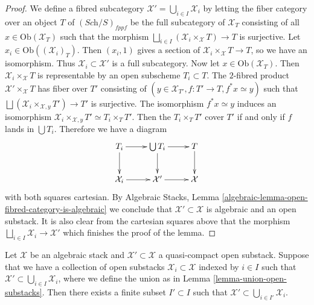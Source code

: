 \begin{proof}
We define a fibred subcategory
$\mathcal{X}' = \bigcup_{i \in I} \mathcal{X}_i$ 
by letting the fiber category over an object $T$ of $(\textit{Sch}/S)_{fppf}$
be the full subcategory of $\mathcal{X}_T$ consisting of all
$x \in \text{Ob}(\mathcal{X}_T)$ such that the morphism
$\bigsqcup_{i \in I} (\mathcal{X}_i \times_{\mathcal X} T) \to T$
is surjective. Let $x_i \in \text{Ob}((\mathcal{X}_i)_T)$.
Then $(x_i, 1)$ gives a section of 
$\mathcal{X}_i \times_{\mathcal X} T \to T$, so we have an isomorphism. Thus
$\mathcal{X}_i \subset \mathcal{X}'$ is a full subcategory. 
Now let $x \in \text{Ob}(\mathcal{X}_T)$. Then
$\mathcal{X}_i \times_{\mathcal X} T$ is representable
by an open subscheme $T_i \subset T$. The $2$-fibred product 
$\mathcal{X}' \times_{\mathcal X} T$ has fiber over $T'$ consisting
of $(y \in \mathcal{X}_{T'}, f : T' \to T, f^*x \simeq y)$ such that 
$\bigsqcup (\mathcal{X}_i \times_{\mathcal X, y} T') \to T'$ is surjective. 
The isomorphism $f^*x \simeq y$ induces an isomorphism
$\mathcal{X}_i \times_{\mathcal X,y} T' \simeq T_i \times_T T'$.
Then the $T_i \times_T T'$ cover $T'$ if and only if $f$ lands in
$\bigcup T_i$. Therefore we have a diagram
$$
\xymatrix{
T_i \ar[r] \ar[d] &
\bigcup T_i \ar[r] \ar[d] &
T \ar[d] \\ 
\mathcal{X}_i \ar[r] &
\mathcal{X}' \ar[r] &
\mathcal{X}
}
$$
with both squares cartesian. By
Algebraic Stacks, Lemma \ref{algebraic-lemma-open-fibred-category-is-algebraic}
we conclude that $\mathcal{X'} \subset \mathcal{X}$ is algebraic and an
open substack. It is also clear from the cartesian squares above that the
morphism $\bigsqcup_{i \in I} \mathcal{X}_i \to \mathcal{X}'$ which
finishes the proof of the lemma.
\end{proof}

\begin{lemma} 
\label{lemma-quasicompact-finite-subcover} 
Let $\mathcal X$ be an algebraic stack and $\mathcal X' \subset \mathcal X$
a quasi-compact open substack. Suppose that we have a collection of open
substacks $\mathcal{X}_i \subset \mathcal X$  indexed by $i \in I$ such
that $\mathcal{X}' \subset \bigcup_{i \in I} \mathcal{X}_i$,
where we define the union as in Lemma \ref{lemma-union-open-substacks}. 
Then there exists a finite subset $I' \subset I$ such that
$\mathcal{X}' \subset \bigcup_{i \in I'} \mathcal{X}_i$. 
\end{lemma}

